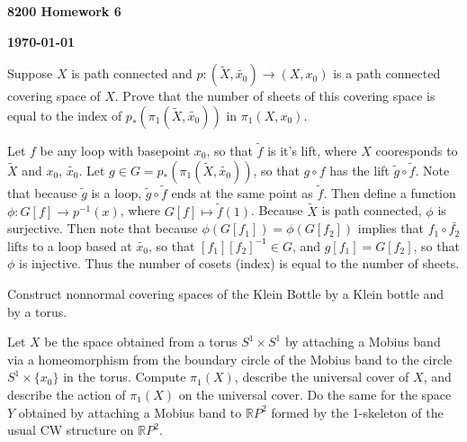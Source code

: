 \documentclass[12pt]{article}
\begin{document}
\begin{newtitle}
  \begin{center}
    \textbf{\Huge 8200 Homework 6}
  \end{center}
  \hfill \textbf{\today}
\end{newtitle}

\begin{statement}
  Suppose $X$ is path connected and $p: (\tilde{X},\tilde{x_0}) \to (X,x_0)$ is a path connected covering space of $X$. 
  Prove that the number of sheets of this covering space is equal to the index of $p_*(\pi_1(\tilde{X},\tilde{x_0}))$ 
  in $\pi_1(X,x_0)$.
\end{statement}

\begin{newproof}
  Let $f$ be any loop with basepoint $x_0$, so that $\tilde{f}$ is it's lift, where $X$ cooresponds to 
  $\tilde{X}$ and $x_0$, $\tilde{x_0}$. Let $g \in G=p_*(\pi_1(\tilde{X},\tilde{x_0}))$, so that $g \circ f$ has 
  the lift $\tilde{g} \circ \tilde{f}$. Note that because $\tilde{g}$ is a loop, $\tilde{g} \circ 
  \tilde{f}$ ends at the same point as $\tilde{f}$. Then define a function $\phi: G[f] \to p^{-1}(x)$, 
  where $G[f] \mapsto \tilde{f}(1)$. Because $\tilde{X}$ is path connected, $\phi$ is surjective. 
  Then note that because $\phi(G[f_1])=\phi(G[f_2])$ implies that $f_1 \circ \bar{f_2}$ 
  lifts to a loop based at $\tilde{x_0}$, so that $[f_1][f_2]^{-1} \in G$, and $g[f_1]=G[f_2]$, so 
  that $\phi$ is injective. Thus the number of cosets (index) is equal to the number of sheets. 
\end{newproof}

\begin{statement}
  Construct nonnormal covering spaces of the Klein Bottle by a Klein bottle and by a torus. 
\end{statement}

\begin{newproof}

\end{newproof}

\begin{statement}
  Let $X$ be the space obtained from a torus $S^1 \times S^1$ by attaching a Mobius band via a 
  homeomorphism from the boundary circle of the Mobius band to the circle $S^1 \times \{x_0\}$ 
  in the torus. Compute $\pi_1(X)$, describe the universal cover of $X$, and describe the action 
  of $\pi_1(X)$ on the universal cover. Do the same for the space $Y$ obtained by attaching 
  a Mobius band to $\mathbb{R}P^2$ formed by the 1-skeleton of the usual CW structure on $\mathbb{R}P^2$. 
\end{statement}
\end{document}
